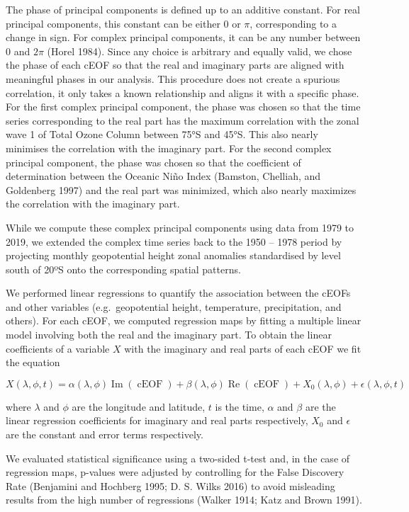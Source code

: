 \documentclass[smallextended]{svjour3}       %
\begin{document}
The phase of principal components is defined up to an additive constant.
For real principal components, this constant can be either 0 or \(\pi\), corresponding to a change in sign.
For complex principal components, it can be any number between 0 and \(2\pi\) (Horel 1984).
Since any choice is arbitrary and equally valid, we chose the phase of each cEOF so that the real and imaginary parts are aligned with meaningful phases in our analysis.
This procedure does not create a spurious correlation, it only takes a known relationship and aligns it with a specific phase.
For the first complex principal component, the phase was chosen so that the time series corresponding to the real part has the maximum correlation with the zonal wave 1 of Total Ozone Column between 75°S and 45°S.
This also nearly minimises the correlation with the imaginary part.
For the second complex principal component, the phase was chosen so that the coefficient of determination between the Oceanic Niño Index (Bamston, Chelliah, and Goldenberg 1997) and the real part was minimized, which also nearly maximizes the correlation with the imaginary part.



While we compute these complex principal components using data from 1979 to 2019, we extended the complex time series back to the 1950 -- 1978 period by projecting monthly geopotential height zonal anomalies standardised by level south of 20ºS onto the corresponding spatial patterns.

We performed linear regressions to quantify the association between the cEOFs and other variables (e.g.~geopotential height, temperature, precipitation, and others).
For each cEOF, we computed regression maps by fitting a multiple linear model involving both the real and the imaginary part.
To obtain the linear coefficients of a variable \(X\) with the imaginary and real parts of each cEOF we fit the equation

\[
X(\lambda, \phi, t) = \alpha(\lambda, \phi) \operatorname{Im}(\operatorname{cEOF}) + \beta(\lambda, \phi) \operatorname{Re}(\operatorname{cEOF}) + X_0(\lambda, \phi) +  \epsilon(\lambda, \phi, t)
\]

where \(\lambda\) and \(\phi\) are the longitude and latitude, \(t\) is the time, \(\alpha\) and \(\beta\) are the linear regression coefficients for imaginary and real parts respectively, \(X_0\) and \(\epsilon\) are the constant and error terms respectively.

We evaluated statistical significance using a two-sided t-test and, in the case of regression maps, p-values were adjusted by controlling for the False Discovery Rate (Benjamini and Hochberg 1995; D. S. Wilks 2016) to avoid misleading results from the high number of regressions (Walker 1914; Katz and Brown 1991).
\end{document}
